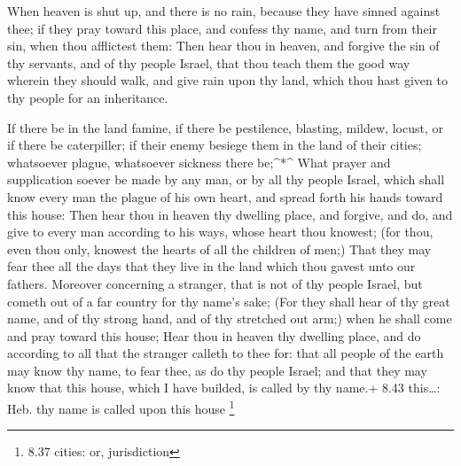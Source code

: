  When heaven is shut up, and there is no rain, because they
have sinned against thee; if they pray toward this place, and confess
thy name, and turn from their sin, when thou afflictest them:
 Then hear thou in heaven, and forgive the sin of thy
servants, and of thy people Israel, that thou teach them the good way
wherein they should walk, and give rain upon thy land, which thou hast
given to thy people for an inheritance.

 If there be in the land famine, if there be pestilence,
blasting, mildew, locust, or if there be caterpiller; if their enemy
besiege them in the land of their cities; whatsoever plague, whatsoever
sickness there be;\^{}*\^{}  What prayer and supplication
soever be made by any man, or by all thy people Israel, which shall know
every man the plague of his own heart, and spread forth his hands toward
this house:  Then hear thou in heaven thy dwelling place,
and forgive, and do, and give to every man according to his ways, whose
heart thou knowest; (for thou, even thou only, knowest the hearts of all
the children of men;)  That they may fear thee all the days
that they live in the land which thou gavest unto our fathers.
 Moreover concerning a stranger, that is not of thy people
Israel, but cometh out of a far country for thy name's sake;
 (For they shall hear of thy great name, and of thy strong
hand, and of thy stretched out arm;) when he shall come and pray toward
this house;  Hear thou in heaven thy dwelling place, and do
according to all that the stranger calleth to thee for: that all people
of the earth may know thy name, to fear thee, as do thy people Israel;
and that they may know that this house, which I have builded, is called
by thy name.+ 8.43 this\ldots: Heb. thy name is called upon this house
\footnote{8.37 cities: or, jurisdiction}

